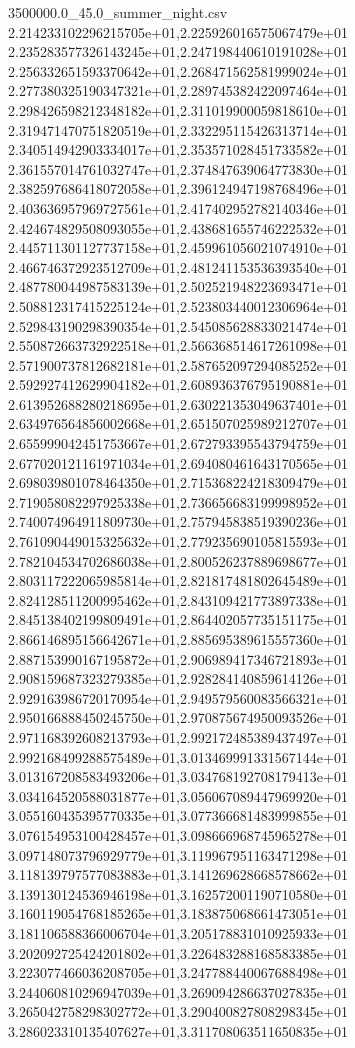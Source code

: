 \begin{filecontents*}{3500000.0_45.0_summer_night.csv}
2.214233102296215705e+01,2.225926016575067479e+01
2.235283577326143245e+01,2.247198440610191028e+01
2.256332651593370642e+01,2.268471562581999024e+01
2.277380325190347321e+01,2.289745382422097464e+01
2.298426598212348182e+01,2.311019900059818610e+01
2.319471470751820519e+01,2.332295115426313714e+01
2.340514942903334017e+01,2.353571028451733582e+01
2.361557014761032747e+01,2.374847639064773830e+01
2.382597686418072058e+01,2.396124947198768496e+01
2.403636957969727561e+01,2.417402952782140346e+01
2.424674829508093055e+01,2.438681655746222532e+01
2.445711301127737158e+01,2.459961056021074910e+01
2.466746372923512709e+01,2.481241153536393540e+01
2.487780044987583139e+01,2.502521948223693471e+01
2.508812317415225124e+01,2.523803440012306964e+01
2.529843190298390354e+01,2.545085628833021474e+01
2.550872663732922518e+01,2.566368514617261098e+01
2.571900737812682181e+01,2.587652097294085252e+01
2.592927412629904182e+01,2.608936376795190881e+01
2.613952688280218695e+01,2.630221353049637401e+01
2.634976564856002668e+01,2.651507025989212707e+01
2.655999042451753667e+01,2.672793395543794759e+01
2.677020121161971034e+01,2.694080461643170565e+01
2.698039801078464350e+01,2.715368224218309479e+01
2.719058082297925338e+01,2.736656683199998952e+01
2.740074964911809730e+01,2.757945838519390236e+01
2.761090449015325632e+01,2.779235690105815593e+01
2.782104534702686038e+01,2.800526237889698677e+01
2.803117222065985814e+01,2.821817481802645489e+01
2.824128511200995462e+01,2.843109421773897338e+01
2.845138402199809491e+01,2.864402057735151175e+01
2.866146895156642671e+01,2.885695389615557360e+01
2.887153990167195872e+01,2.906989417346721893e+01
2.908159687323279385e+01,2.928284140859614126e+01
2.929163986720170954e+01,2.949579560083566321e+01
2.950166888450245750e+01,2.970875674950093526e+01
2.971168392608213793e+01,2.992172485389437497e+01
2.992168499288575489e+01,3.013469991331567144e+01
3.013167208583493206e+01,3.034768192708179413e+01
3.034164520588031877e+01,3.056067089447969920e+01
3.055160435395770335e+01,3.077366681483999855e+01
3.076154953100428457e+01,3.098666968745965278e+01
3.097148073796929779e+01,3.119967951163471298e+01
3.118139797577083883e+01,3.141269628668578662e+01
3.139130124536946198e+01,3.162572001190710580e+01
3.160119054768185265e+01,3.183875068661473051e+01
3.181106588366006704e+01,3.205178831010925933e+01
3.202092725424201802e+01,3.226483288168583385e+01
3.223077466036208705e+01,3.247788440067688498e+01
3.244060810296947039e+01,3.269094286637027835e+01
3.265042758298302772e+01,3.290400827808298345e+01
3.286023310135407627e+01,3.311708063511650835e+01

\end{filecontents*}
